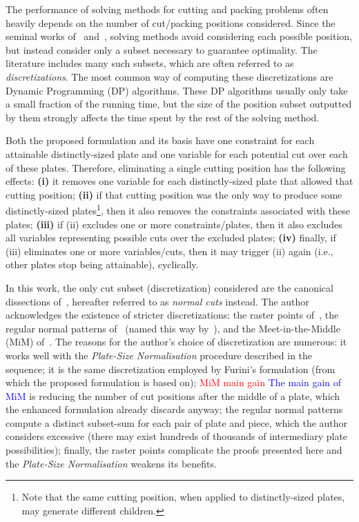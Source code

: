 \documentclass[ppgc,tese,english,formais,babel]{iiufrgs}
\newif\iffinalversion
\newcommand{\newtext}[1]{\iffinalversion%
#1%
\else%
\textcolor{blue}{#1}%
\fi%
}
\newcommand{\oldtext}[1]{\iffinalversion%
\else%
\textcolor{red}{#1}%
\fi%
}
\begin{document}
The performance of solving methods for cutting and packing problems often heavily depends on the number of cut/packing positions considered.
Since the seminal works of~\citet{cw:1977} and~\citet{herz:1972}, solving methods avoid considering each possible position, but instead consider only a subset necessary to guarantee optimality.
The literature includes many such subsets, which are often referred to as \emph{discretizations}.
The most common way of computing these discretizations are Dynamic Programming (DP) algorithms.
These DP algorithms usually only take a small fraction of the running time, but the size of the position subset outputted by them strongly affects the time spent by the rest of the solving method.

Both the proposed formulation and its basis have one constraint for each attainable distinctly-sized plate and one variable for each potential cut over each of these plates.
Therefore, eliminating a single cutting position has the following effects:
\textbf{(i)} it removes one variable for each distinctly-sized plate that allowed that cutting position;
\textbf{(ii)} if that cutting position was the only way to produce some distinctly-sized plates\footnote{Note that the same cutting position, when applied to distinctly-sized plates, may generate different children.}, then it also removes the constraints associated with these plates;
\textbf{(iii)} if (ii) excludes one or more constraints/plates, then it also excludes all variables representing possible cuts over the excluded plates;
\textbf{(iv)} finally, if (iii) eliminates one or more variables/cuts, then it may trigger (ii) again (i.e., other plates stop being attainable), cyclically.

In this work, the only cut subset (discretization) considered are the canonical dissections of~\citet{herz:1972}, hereafter referred to as \emph{normal cuts} instead.
The author acknowledges the existence of stricter discretizations: the raster points of~\citet{terno:1987,guntram:1966}, the regular normal patterns of~\citet{boschetti:2002} (named this way by~\citet{cote:2018}), and the Meet-in-the-Middle (MiM) of~\citet{cote:2018}.
The reasons for the author's choice of discretization are numerous:
it works well with the \emph{Plate-Size Normalisation} procedure described in the sequence;
it is the same discretization employed by Furini's formulation (from which the proposed formulation is based on);
\oldtext{MiM main gain}\newtext{The main gain of MiM} is reducing the number of cut positions after the middle of a plate, which the enhanced formulation already discards anyway;
the regular normal patterns compute a distinct subset-sum for each pair of plate and piece, which the author considers excessive (there may exist hundreds of thousands of intermediary plate possibilities);
finally, the raster points complicate the proofs presented here and the \emph{Plate-Size Normalisation} weakens its benefits.
\end{document}
